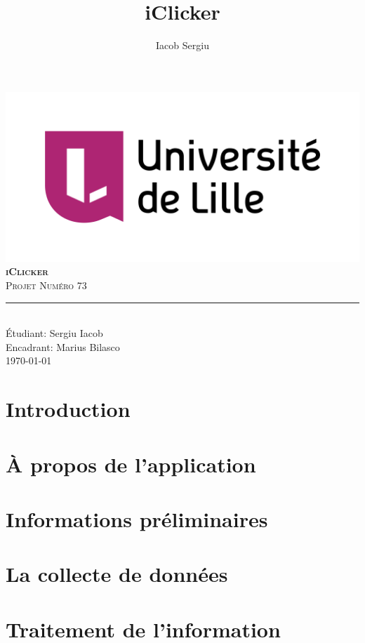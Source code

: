 \documentclass[11pt,titlepage]{report}
\author{Iacob Sergiu}
\title{iClicker}
\begin{document}
\begin{titlepage}
    \centering
    \includegraphics[width=0.75\linewidth]{universite_de_lille.png}\\[0.25cm]
    \vspace{\fill}
    \textbf{\textsc{\fontsize{50}{50}\selectfont iClicker}}\\ \vspace{\fill}		
	\textsc{\LARGE Projet Numéro 73}\\[0.4cm]
    \rule{\linewidth}{0.2 mm}\\[0.5 cm]
    Étudiant: Sergiu Iacob
    \\
    Encadrant: Marius Bilasco
    \\
    \vspace{\fill}
    \monthyeardate\today
\end{titlepage}
\restoregeometry

{\pagestyle{plain}
\tableofcontents
\cleardoublepage}

\chapter{Introduction}



\chapter{À propos de l'application}


\chapter{Informations préliminaires}


\chapter{La collecte de données}


\chapter{Traitement de l'information}

\end{document}
